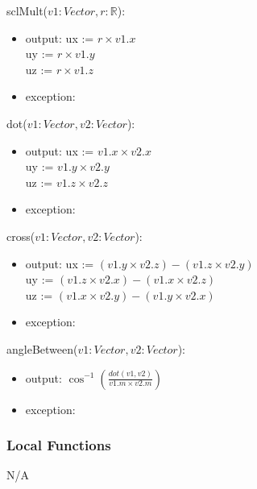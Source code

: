 \documentclass[12pt, titlepage]{article}
\begin{document}
\noindent sclMult($v1:Vector, r:\mathbb{R}$):
\begin{itemize}
	\item output: 
	ux := $r \times v1.x$ \\
	uy := $r \times v1.y$ \\
	uz := $r \times v1.z$ \\	
	\item exception: \\
\end{itemize}


\noindent dot($v1:Vector, v2:Vector$):
\begin{itemize}
	\item output: 
	ux := $v1.x \times v2.x$ \\
	uy := $v1.y \times v2.y$ \\
	uz := $v1.z \times v2.z$ \\
	\item exception: \\
\end{itemize}

\noindent cross($v1:Vector, v2:Vector$):
\begin{itemize}
	\item output: 
	ux := $(v1.y \times v2.z) - (v1.z \times v2.y)$  \\
	uy := $(v1.z \times v2.x) - (v1.x \times v2.z)$  \\
	uz := $(v1.x \times v2.y) - (v1.y \times v2.x)$  \\
	\item exception: \\
\end{itemize}

\noindent angleBetween($v1:Vector, v2:Vector$):
\begin{itemize}
	\item output: $\cos^{-1}(\frac{dot(v1, v2)}{v1.m \times v2.m})$
	\item exception: \\
\end{itemize}

\subsubsection{Local Functions}
N/A
\end{document}
